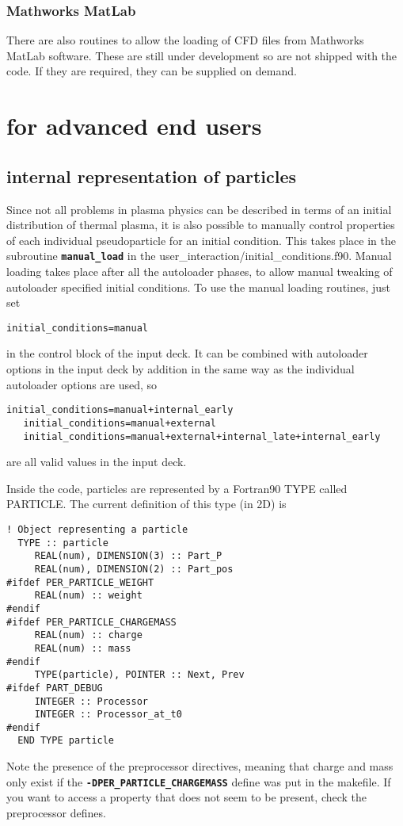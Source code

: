 \documentclass[12pt,a4paper]{article}
\newcommand{\simpleboxverbatim}{\begin{Verbatim}[obeytabs=true,frame=single,
  framerule=0.5mm,rulecolor=\color{warwickmid},formatcom=\color{black}]}
\newcommand{\inlinecode}[1]{{\color{warwickred} \bf\texttt{#1}}}
\newcommand{\EPOCH}{{\color{warwickdark}\fontfamily{phv}\selectfont{EPOCH}}}
\begin{document}
\subsubsection{Mathworks MatLab}
There are also routines to allow the loading of CFD files from Mathworks
MatLab software. These are still under development so are not shipped with the
code. If they are required, they can be supplied on demand.

\section{{\EPOCH} for advanced end users}

\subsection{{\EPOCH} internal representation of particles}
Since not all problems in plasma physics can be described in terms of an
initial distribution of thermal plasma, it is also possible to manually
control properties of each individual pseudoparticle for an initial
condition. This takes place in the subroutine \inlinecode{manual\_load} in the
user\_interaction/initial\_conditions.f90. Manual loading takes place after
all the autoloader phases, to allow manual tweaking of autoloader specified
initial conditions. To use the manual loading routines, just set\\
\simpleboxverbatim
   initial_conditions=manual
\end{Verbatim}
in the control block of the input deck. It can be combined with autoloader
options in the input deck by addition in the same way as the individual
autoloader options are used, so
\simpleboxverbatim
   initial_conditions=manual+internal_early
   initial_conditions=manual+external
   initial_conditions=manual+external+internal_late+internal_early
\end{Verbatim}
are all valid values in the input deck.

Inside the code, particles are represented by a Fortran90 TYPE called
PARTICLE. The current definition of this type (in 2D) is

\simpleboxverbatim
! Object representing a particle
  TYPE :: particle
     REAL(num), DIMENSION(3) :: Part_P
     REAL(num), DIMENSION(2) :: Part_pos
#ifdef PER_PARTICLE_WEIGHT
     REAL(num) :: weight
#endif
#ifdef PER_PARTICLE_CHARGEMASS
     REAL(num) :: charge
     REAL(num) :: mass
#endif
     TYPE(particle), POINTER :: Next, Prev
#ifdef PART_DEBUG
     INTEGER :: Processor
     INTEGER :: Processor_at_t0
#endif
  END TYPE particle
\end{Verbatim}
Note the presence of the preprocessor directives, meaning that charge and mass
only exist if the \inlinecode{-DPER\_PARTICLE\_CHARGEMASS} define was put in
the makefile. If you want to access a property that does not seem to be
present, check the preprocessor defines.
\end{document}
